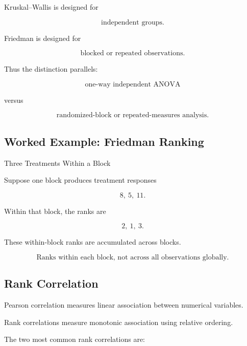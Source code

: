 Kruskal--Wallis is designed for

\[
\boxed{
\text{independent groups}.
}
\]

Friedman is designed for

\[
\boxed{
\text{blocked or repeated observations}.
}
\]

Thus the distinction parallels:

\[
\boxed{
\text{one-way independent ANOVA}
}
\]

versus

\[
\boxed{
\text{randomized-block or repeated-measures analysis}.
}
\]

\subsection{Worked Example: Friedman Ranking}
\label{subsec:worked-friedman-ranking}

\begin{workedexamplebox}{Three Treatments Within a Block}

Suppose one block produces treatment responses

\[
8,\ 5,\ 11.
\]

Within that block, the ranks are

\[
2,\ 1,\ 3.
\]

These within-block ranks are accumulated across blocks.

\begin{answerbox}
\[
\boxed{
\text{Ranks within each block, not across all observations globally.}
}
\]
\end{answerbox}

\end{workedexamplebox}

\subsection{Rank Correlation}
\label{subsec:rank-correlation}

Pearson correlation measures linear association between numerical
variables.

Rank correlations measure monotonic association using relative ordering.

The two most common rank correlations are:

